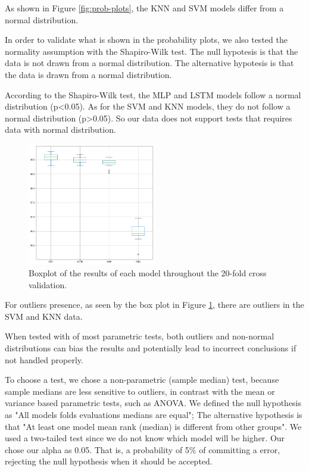 As shown in Figure \ref{fig:prob-plots}, the KNN and SVM models differ from a normal distribution. 

In order to validate what is shown in the probability plots, we also tested the normality assumption with the Shapiro-Wilk test. The null hypotesis is that the data is not drawn from a normal distribution. The alternative hypotesis is that the data is drawn from a normal distribution.

According to the Shapiro-Wilk test, the MLP and LSTM models follow a normal distribution (p<0.05). As for the SVM and KNN models, they do not follow a normal distribution (p>0.05). So our data does not support tests that requires data with normal distribution.

\begin{figure}[!ht]
    \centering
    \includegraphics[width=0.5\textwidth]{img/results/boxplot.png}
    \caption{Boxplot of the results of each model throughout the 20-fold cross validation.}
    \label{fig:results-boxplot}
\end{figure}

For outliers presence, as seen by the box plot in Figure \ref{fig:results-boxplot}, there are outliers in the SVM and KNN data.

When tested with of most parametric tests, both outliers and non-normal distributions can bias the results and potentially lead to incorrect conclusions if not handled properly.

To choose a test, we chose a non-parametric (sample median) test, because sample medians are less sensitive to outliers, in contrast with the mean or variance based parametric tests, such as ANOVA.
We defined the null hypothesis as "All models folds evaluations medians are equal"; The alternative hypothesis is that "At least one model mean rank (median) is different from other groups".
We used a two-tailed test since we do not know which model will be higher.
Our chose our alpha as 0.05. That is, a probability of 5\% of committing a error, rejecting the null hypothesis when it should be accepted.

